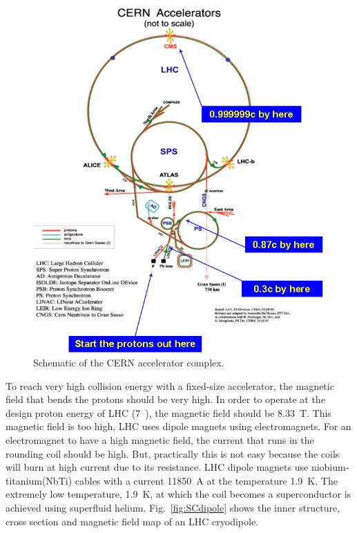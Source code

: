 %
\begin{figure}[ht!] 
\centering 
\includegraphics[width=0.99\textwidth]{figures/Cern-complex.png}
\caption{Schematic of the CERN accelerator complex.} 
\label{fig:cerncomplex} 
\end{figure} 


To reach very high collision energy with a fixed-size accelerator, 
the magnetic field that bends the protons should be very high. 
In order to operate at the design proton energy of LHC (7~\TeV), 
the magnetic field should be 8.33~T. This magnetic field is too high, 
LHC uses dipole magnets using electromagnets. For an electromagnet 
to have a high magnetic field, the current that runs in the rounding coil 
should be high. But, practically this is not easy because the coils will burn 
at high current due to its resistance. LHC dipole magnets use 
niobium-titanium(NbTi) cables with a current 11850~A at the temperature 1.9~K.
The extremely low temperature, 1.9~K, at which the coil becomes a superconductor
is achieved using superfluid helium.  
Fig.~\ref{fig:SCdipole} shows the inner structure, cross section and magnetic field map of
an LHC cryodipole.

